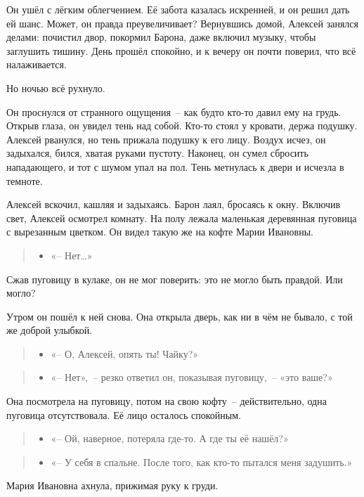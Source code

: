 \documentclass[12pt,a4paper]{book}
\newenvironment{dialogue}{\begin{quote}\itshape\begin{itemize}\item[]}{\end{itemize}\end{quote}}
\begin{document}
Он ушёл с лёгким облегчением. Её забота казалась искренней, и он решил дать ей шанс. Может, он правда преувеличивает? Вернувшись домой, Алексей занялся делами: почистил двор, покормил Барона, даже включил музыку, чтобы заглушить тишину. День прошёл спокойно, и к вечеру он почти поверил, что всё налаживается.

Но ночью всё рухнуло.

Он проснулся от странного ощущения~-- как будто кто-то давил ему на грудь. Открыв глаза, он увидел тень над собой. Кто-то стоял у кровати, держа подушку. Алексей рванулся, но тень прижала подушку к его лицу. Воздух исчез, он задыхался, бился, хватая руками пустоту. Наконец, он сумел сбросить нападающего, и тот с шумом упал на пол. Тень метнулась к двери и исчезла в темноте.

Алексей вскочил, кашляя и задыхаясь. Барон лаял, бросаясь к окну. Включив свет, Алексей осмотрел комнату. На полу лежала маленькая деревянная пуговица с вырезанным цветком. Он видел такую же на кофте Марии Ивановны.

\begin{dialogue}
«-- Нет\ldots»
\end{dialogue}

Сжав пуговицу в кулаке, он не мог поверить: это не могло быть правдой. Или могло?

Утром он пошёл к ней снова. Она открыла дверь, как ни в чём не бывало, с той же доброй улыбкой.

\begin{dialogue}
«-- О, Алексей, опять ты! Чайку?»
\end{dialogue}

\begin{dialogue}
«-- Нет»,~-- резко ответил он, показывая пуговицу,~-- «это ваше?»
\end{dialogue}

Она посмотрела на пуговицу, потом на свою кофту~-- действительно, одна пуговица отсутствовала. Её лицо осталось спокойным.

\begin{dialogue}
«-- Ой, наверное, потеряла где-то. А где ты её нашёл?»
\end{dialogue}

\begin{dialogue}
«-- У себя в спальне. После того, как кто-то пытался меня задушить.»
\end{dialogue}

Мария Ивановна ахнула, прижимая руку к груди.
\end{document}
